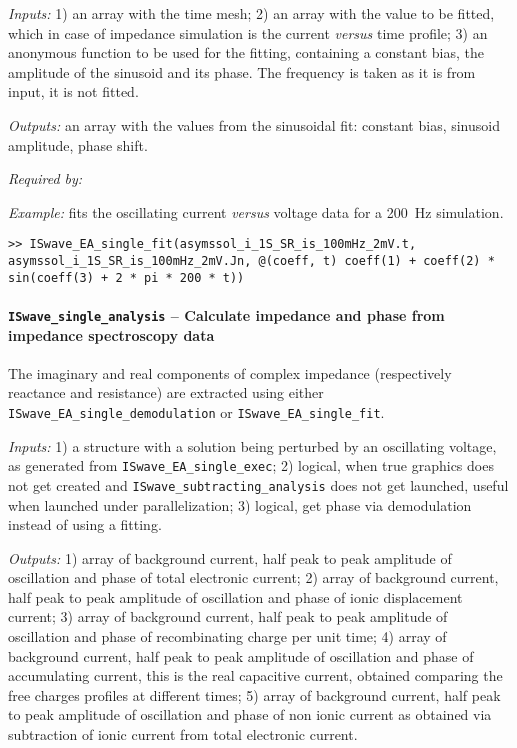 \textit{Inputs:} 1) an array with the time mesh;
   2) an array with the value to be fitted, which in case of impedance simulation is the current \textsl{versus} time profile;
   3) an anonymous function to be used for the fitting, containing
     a constant bias, the amplitude of the sinusoid and its phase. The
     frequency is taken as it is from input, it is not fitted.

\textit{Outputs:} an array with the values from the sinusoidal fit: constant
     bias, sinusoid amplitude, phase shift.


\textit{Required by:} 

		\textit{Example:} fits the oscillating current \textsl{versus} voltage data for a \SI{200}{\Hz} simulation.
\begin{lstlisting}[style=Matlab-editor]
>> ISwave_EA_single_fit(asymssol_i_1S_SR_is_100mHz_2mV.t, asymssol_i_1S_SR_is_100mHz_2mV.Jn, @(coeff, t) coeff(1) + coeff(2) * sin(coeff(3) + 2 * pi * 200 * t))
\end{lstlisting}



\paragraph{\texttt{ISwave\_single\_analysis} -- Calculate impedance and phase from impedance spectroscopy data}
The imaginary and real components of complex impedance (respectively reactance and resistance) are extracted using either \texttt{ISwave\_EA\_single\_demodulation} or \texttt{ISwave\_EA\_single\_fit}.

\textit{Inputs:} 1) a structure with a solution being perturbed by an
     oscillating voltage, as generated from \texttt{ISwave\_EA\_single\_exec};
   2) logical, when true graphics does not get created and
     \texttt{ISwave\_subtracting\_analysis} does not get launched, useful when
     launched under parallelization;
   3) logical, get phase via demodulation instead of using a fitting.

\textit{Outputs:} 1) array of background current, half peak to peak amplitude of
     oscillation and phase of total electronic current;
   2) array of background current, half peak to peak amplitude of
     oscillation and phase of ionic displacement current;
   3) array of background current, half peak to peak amplitude of
     oscillation and phase of recombinating charge per unit time;
   4) array of background current, half peak to peak amplitude of
     oscillation and phase of accumulating current, this is the real
     capacitive current, obtained comparing the free charges profiles at
     different times;
   5) array of background current, half peak to peak amplitude of
     oscillation and phase of non ionic current as obtained via
     subtraction of ionic current from total electronic current.

